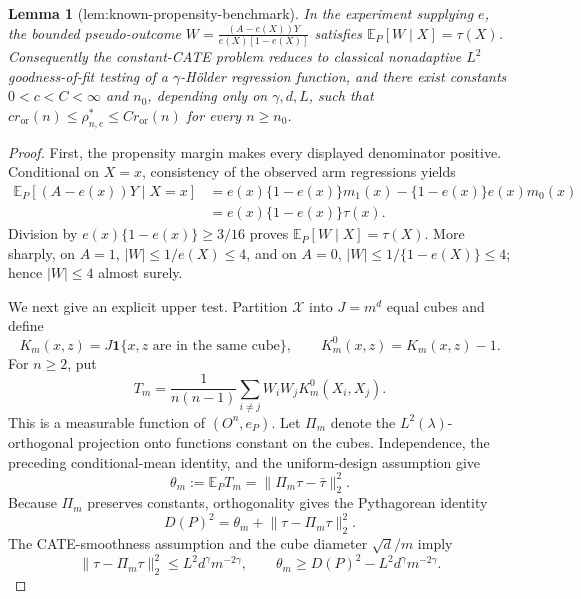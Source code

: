 \documentclass{article}
\newtheorem{lemma}{Lemma}
\begin{document}
\begin{lemma}[lem:known-propensity-benchmark]\label{lem:known-propensity-benchmark}
In the experiment supplying \(e\), the bounded pseudo-outcome \(W=\frac{(A-e(X))Y}{e(X)[1-e(X)]}\) satisfies \(\mathbb E_P[W\mid X]=\tau(X)\). Consequently the constant-CATE problem reduces to classical nonadaptive \(L^2\) goodness-of-fit testing of a \(\gamma\)-Hölder regression function, and there exist constants \(0<c<C<\infty\) and \(n_0\), depending only on \(\gamma,d,L\), such that \(c r_{\mathrm{or}}(n)\le\rho_{n,e}^*\le C r_{\mathrm{or}}(n)\) for every \(n\ge n_0\).
\end{lemma}
\begin{proof}
First, the propensity margin makes every displayed denominator positive. Conditional on \(X=x\), consistency of the observed arm regressions yields
\[
 \begin{aligned}
 \mathbb E_P[(A-e(x))Y\mid X=x]
 &=e(x)\{1-e(x)\}m_1(x)
   -\{1-e(x)\}e(x)m_0(x)\\
 &=e(x)\{1-e(x)\}\tau(x).
 \end{aligned}
\]
Division by \(e(x)\{1-e(x)\}\ge3/16\) proves \(\mathbb E_P[W\mid X]=\tau(X)\). More sharply, on \(A=1\), \(|W|\le1/e(X)\le4\), and on \(A=0\), \(|W|\le1/\{1-e(X)\}\le4\); hence \(|W|\le4\) almost surely.

We next give an explicit upper test. Partition \(\mathcal X\) into \(J=m^d\) equal cubes and define
\[
 K_m(x,z)=J\mathbf 1\{x,z\text{ are in the same cube}\},
 \qquad K_m^0(x,z)=K_m(x,z)-1.
\]
For \(n\ge2\), put
\[
 T_m=\frac1{n(n-1)}\sum_{i\ne j}W_iW_jK_m^0(X_i,X_j).
\]
This is a measurable function of \((O^n,e_P)\). Let \(\Pi_m\) denote the \(L^2(\lambda)\)-orthogonal projection onto functions constant on the cubes. Independence, the preceding conditional-mean identity, and the uniform-design assumption give
\[
 \theta_m:=\mathbb E_PT_m
 =\lVert\Pi_m\tau-\bar\tau\rVert_2^2.
\]
Because \(\Pi_m\) preserves constants, orthogonality gives the Pythagorean identity
\[
 D(P)^2=\theta_m+\lVert\tau-\Pi_m\tau\rVert_2^2.
\]
The CATE-smoothness assumption and the cube diameter \(\sqrt d/m\) imply
\[
 \lVert\tau-\Pi_m\tau\rVert_2^2
 \le L^2d^\gamma m^{-2\gamma},
 \qquad
 \theta_m\ge D(P)^2-L^2d^\gamma m^{-2\gamma}.
\]


\end{proof}
\end{document}
